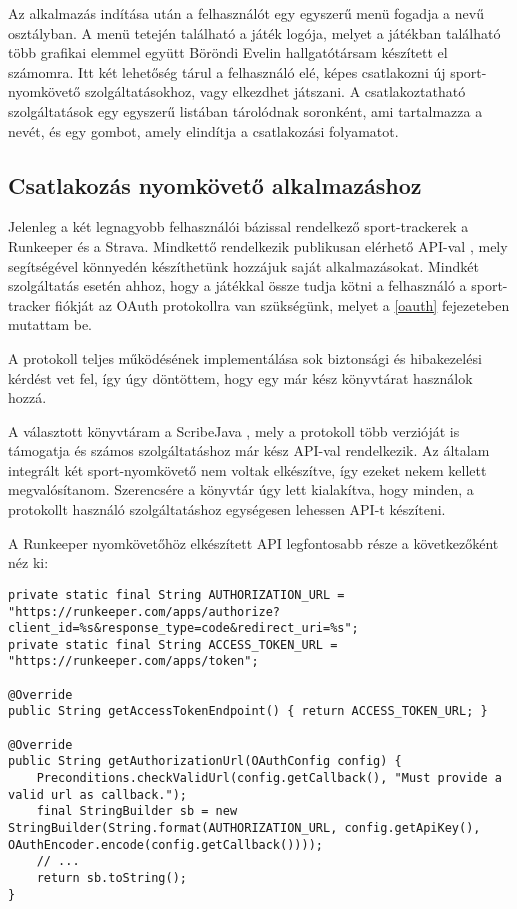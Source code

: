 Az alkalmazás indítása után a felhasználót egy egyszerű menü fogadja a  nevű osztályban. 
A menü tetején található a játék logója, melyet a játékban található több grafikai elemmel együtt Böröndi Evelin hallgatótársam készített el számomra. 
Itt két lehetőség tárul a felhasználó elé, képes csatlakozni új sport-nyomkövető szolgáltatásokhoz, vagy elkezdhet játszani. 
A csatlakoztatható szolgáltatások egy egyszerű listában tárolódnak soronként, ami tartalmazza a nevét, és egy gombot, amely elindítja a csatlakozási folyamatot. 

\subsection*{Csatlakozás nyomkövető alkalmazáshoz}
\label{trackerconnect}
Jelenleg a két legnagyobb felhasználói bázissal rendelkező sport-trackerek a Runkeeper és a Strava. 
Mindkettő rendelkezik publikusan elérhető API-val \cite{runkeeperapi} \cite{stravaapi}, mely segítségével könnyedén készíthetünk hozzájuk saját alkalmazásokat. 
Mindkét szolgáltatás esetén ahhoz, hogy a játékkal össze tudja kötni a felhasználó a sport-tracker fiókját az OAuth protokollra van szükségünk, melyet a \ref{oauth} fejezeteben mutattam be. 

A protokoll teljes működésének implementálása sok biztonsági és hibakezelési kérdést vet fel, így úgy döntöttem, hogy egy már kész könyvtárat használok hozzá. 

A választott könyvtáram a ScribeJava \cite{scribejava}, mely a protokoll több verzióját is támogatja és számos szolgáltatáshoz már kész API-val rendelkezik. 
Az általam integrált két sport-nyomkövető nem voltak elkészítve, így ezeket nekem kellett megvalósítanom. 
Szerencsére a könyvtár úgy lett kialakítva, hogy minden, a protokollt használó szolgáltatáshoz egységesen lehessen API-t készíteni. 

A Runkeeper nyomkövetőhöz elkészített API legfontosabb része a következőként néz ki:

\begin{lstlisting}
private static final String AUTHORIZATION_URL = "https://runkeeper.com/apps/authorize?client_id=%s&response_type=code&redirect_uri=%s";
private static final String ACCESS_TOKEN_URL = "https://runkeeper.com/apps/token";

@Override
public String getAccessTokenEndpoint() { return ACCESS_TOKEN_URL; }

@Override
public String getAuthorizationUrl(OAuthConfig config) {
	Preconditions.checkValidUrl(config.getCallback(), "Must provide a valid url as callback.");
	final StringBuilder sb = new StringBuilder(String.format(AUTHORIZATION_URL, config.getApiKey(), OAuthEncoder.encode(config.getCallback())));
	// ...
	return sb.toString();
}
\end{lstlisting}

